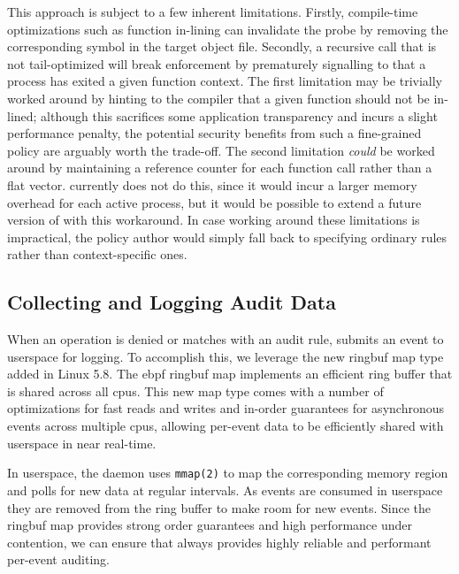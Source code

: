 This approach is subject to a few inherent limitations.  Firstly, compile-time
optimizations such as function in-lining can invalidate the probe by removing the
corresponding symbol in the target object file. Secondly, a recursive call that is not
tail-optimized will break enforcement by prematurely signalling to \bpfbox{} that
a process has exited a given function context.  The first limitation may be trivially
worked around by hinting to the compiler that a given function should not be in-lined;
although this sacrifices some application transparency and incurs a slight performance
penalty, the potential security benefits from such a fine-grained policy are arguably
worth the trade-off.  The second limitation \textit{could} be worked around by maintaining
a reference counter for each function call rather than a flat vector. \bpfbox{} currently
does not do this, since it would incur a larger memory overhead for each active process,
but it would be possible to extend a future version of \bpfbox{} with this workaround. In
case working around these limitations is impractical, the policy author would simply fall
back to specifying ordinary rules rather than context-specific ones.



\subsection{Collecting and Logging Audit Data}%
\label{ss:bpfbox-audit}

When an operation is denied or matches with an audit rule, \bpfbox{} submits an event to
userspace for logging. To accomplish this, we leverage the new ringbuf map type added in
Linux 5.8. The \gls{ebpf} ringbuf map implements an efficient ring buffer that is shared
across all \glspl{cpu}. This new map type comes with a number of optimizations for fast
reads and writes and in-order guarantees for asynchronous events across multiple
\glspl{cpu}, allowing per-event data to be efficiently shared with userspace in near
real-time.

In userspace, the \bpfbox{} daemon uses \texttt{mmap(2)} to map the corresponding memory
region and polls for new data at regular intervals. As events are consumed in userspace
they are removed from the ring buffer to make room for new events.  Since the ringbuf map
provides strong order guarantees and high performance under contention, we can ensure that
\bpfbox{} always provides highly reliable and performant per-event auditing.




